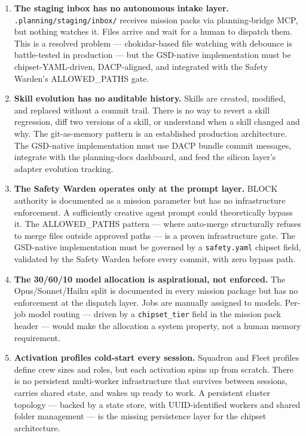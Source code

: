 \documentclass[11pt,letterpaper]{article}
\begin{document}
\begin{enumerate}
  \item \textbf{The staging inbox has no autonomous intake layer.} \texttt{.planning/staging/inbox/} receives mission packs via planning-bridge MCP, but nothing watches it. Files arrive and wait for a human to dispatch them. This is a resolved problem --- chokidar-based file watching with debounce is battle-tested in production --- but the GSD-native implementation must be chipset-YAML-driven, DACP-aligned, and integrated with the Safety Warden's ALLOWED\_PATHS gate.

  \item \textbf{Skill evolution has no auditable history.} Skills are created, modified, and replaced without a commit trail. There is no way to revert a skill regression, diff two versions of a skill, or understand when a skill changed and why. The git-as-memory pattern is an established production architecture. The GSD-native implementation must use DACP bundle commit messages, integrate with the planning-docs dashboard, and feed the silicon layer's adapter evolution tracking.

  \item \textbf{The Safety Warden operates only at the prompt layer.} BLOCK authority is documented as a mission parameter but has no infrastructure enforcement. A sufficiently creative agent prompt could theoretically bypass it. The ALLOWED\_PATHS pattern --- where auto-merge structurally refuses to merge files outside approved paths --- is a proven infrastructure gate. The GSD-native implementation must be governed by a \texttt{safety.yaml} chipset field, validated by the Safety Warden before every commit, with zero bypass path.

  \item \textbf{The 30/60/10 model allocation is aspirational, not enforced.} The Opus/Sonnet/Haiku split is documented in every mission package but has no enforcement at the dispatch layer. Jobs are manually assigned to models. Per-job model routing --- driven by a \texttt{chipset\_tier} field in the mission pack header --- would make the allocation a system property, not a human memory requirement.

  \item \textbf{Activation profiles cold-start every session.} Squadron and Fleet profiles define crew sizes and roles, but each activation spins up from scratch. There is no persistent multi-worker infrastructure that survives between sessions, carries shared state, and wakes up ready to work. A persistent cluster topology --- backed by a state store, with UUID-identified workers and shared folder management --- is the missing persistence layer for the chipset architecture.


\end{enumerate}
\end{document}
